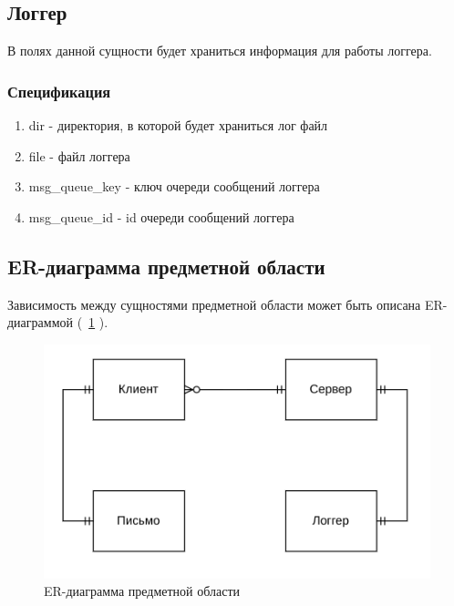 \documentclass[a4paper,12pt]{report}
\begin{document}
\subsection{Логгер}

В полях данной сущности будет храниться информация для работы логгера.

\subsubsection{Спецификация}

\begin{enumerate}
	\item dir - директория, в которой будет храниться лог файл
	\item file - файл логгера
	\item msg\_queue\_key - ключ очереди сообщений логгера
	\item msg\_queue\_id - id очереди сообщений логгера
	
\end{enumerate}

\newpage


\subsection{ER-диаграмма предметной области}

Зависимость между сущностями предметной области может быть описана ER-диаграммой (~\ref{fig:er_diagram} ).

\begin{figure}
    \centering
    \includegraphics[width=\textwidth]{../images/er.png}
    \caption{ER-диаграмма предметной области}
    \label{fig:er_diagram}
\end{figure}
\end{document}
